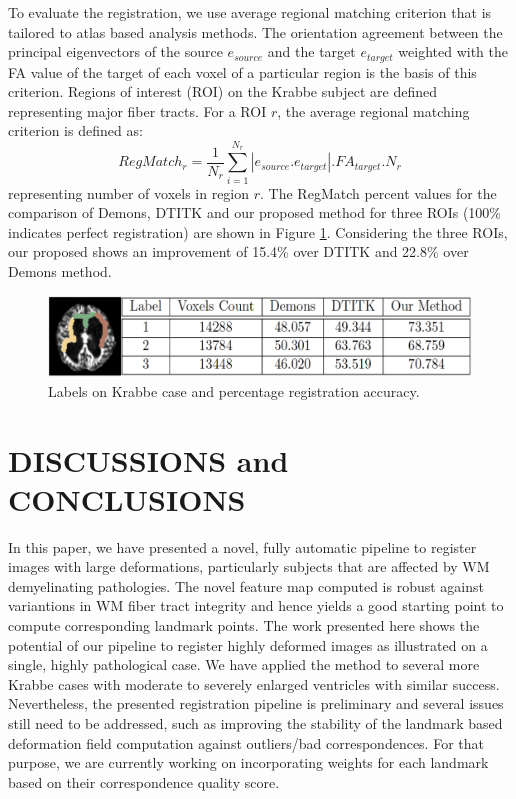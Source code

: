 \documentclass{llncs}
\begin{document}
To evaluate the registration, we use average regional matching criterion that is tailored to atlas based analysis methods. The orientation agreement between the principal eigenvectors of the source $e_{source}$ and the target $e_{target}$ weighted with the FA value of the target of each voxel of a particular region is the basis of this criterion. Regions of interest (ROI) on the Krabbe subject are defined representing major fiber tracts. For a ROI $r$, the average regional matching criterion is defined as: 
\begin{equation}
RegMatch_{r} = \frac{1}{N_{r}} \sum_{i=1}^{N_{r}} |e_{source}.e_{target}|.FA_{target}. N_{r}
\end{equation}
representing number of voxels in region $r$. The RegMatch percent values for the comparison of Demons, DTITK and our proposed method for three ROIs (100\% indicates perfect registration) are shown in Figure \ref{fig:Label_Table}. Considering the three ROIs, our proposed shows an improvement of 15.4\% over DTITK and 22.8\% over Demons method. 

\begin{figure}[htb]
\includegraphics[width=1.0\columnwidth]{images/Table_LabelMap.png}
\centering
\caption{Labels on Krabbe case and percentage registration accuracy.}
\label{fig:Label_Table}
\end{figure}

\section{DISCUSSIONS and CONCLUSIONS}
In this paper, we have presented a novel, fully automatic pipeline to register images with large deformations, particularly subjects that are affected by WM demyelinating pathologies. The novel feature map computed is robust against variantions in WM fiber tract integrity and hence yields a good starting point to compute corresponding landmark points. The work presented here shows the potential of our pipeline to register highly deformed images as illustrated on a single, highly pathological case. We have applied the method to several more Krabbe cases with moderate to severely enlarged ventricles with similar success. Nevertheless, the presented registration pipeline is preliminary and several issues still need to be addressed, such as improving the stability of the landmark based deformation field computation against outliers/bad correspondences. For that purpose, we are currently working on incorporating weights for each landmark based on their correspondence quality score.

%
%


\end{document}
